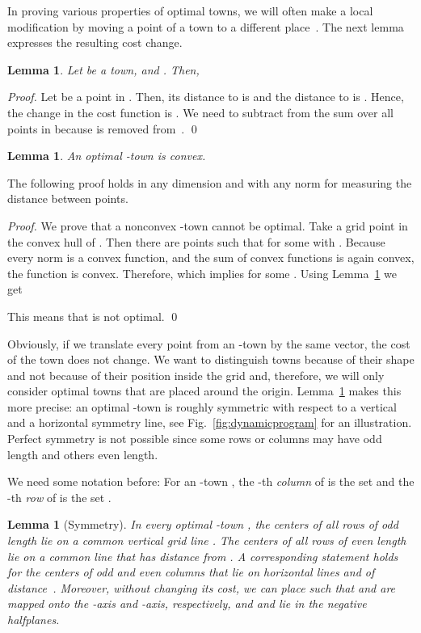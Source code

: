 \documentclass[preprint,authoryear,12pt]{elsarticle}
\newtheorem{lemma}[theorem]{Lemma}
\begin{document}
In proving various properties of optimal towns, we will often make a
local modification by moving a point  of a town to a different
place~. The next lemma expresses the resulting cost change.


\begin{lemma}\label{lem:changecostfunc}
Let  be a town,  and . Then,

\end{lemma}
\begin{proof}
Let  be a point in . Then, its distance to  is 
and the distance to  is . Hence, the change in the
cost function is . We need to subtract
 from the sum over all points in  because  is
removed from~.
\qed
\end{proof}


\begin{lemma}\label{lem:convex}
An optimal -town is convex.
\end{lemma}


The following proof holds in any dimension and with any norm for measuring
the distance between points.
\begin{proof}
We prove that a nonconvex -town  cannot be optimal.
Take a grid point  in the convex hull of .
Then there are points  such that
 for some
 with . Because every norm is a convex function, and the sum of convex
functions is again convex, the function  is convex. Therefore,  which implies  for some . Using Lemma~\ref{lem:changecostfunc} we
get

This means that  is not optimal.
\qed
\end{proof}


Obviously, if we translate every point from an -town by the same
vector, the cost of the town does not change. We want to distinguish
towns because of their shape and not because of their position
inside the grid and, therefore, we will only consider optimal towns
that are placed around the origin. Lemma~\ref{lem:symmetry} makes
this more precise:
an optimal -town is roughly
symmetric with respect to a vertical and a horizontal symmetry line,
see Fig.~\ref{fig:dynamicprogram} for an illustration.
Perfect symmetry is not possible
since some rows or columns may have odd length and others even length.

We need some notation before: For an -town
, the -th \emph{column} of  is the set  and the -th \emph{row} of  is the set
.


\begin{lemma}[Symmetry]
\label{lem:symmetry}
In every optimal -town , the centers of all rows of odd length
lie on a common vertical grid line . The centers of all rows of even
length lie on a common line  that has distance  from
. A corresponding statement holds for the centers of odd and
even columns that lie on horizontal lines  and  of
distance~. Moreover, without changing its cost, we can
place  such that  and  are mapped onto the -axis and
-axis, respectively, and  and  lie in the negative
halfplanes.
\end{lemma}
\end{document}
